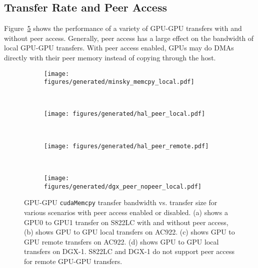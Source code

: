 \subsection{Transfer Rate and Peer Access}
\label{sec:explicit-peer-bandwidth}

Figure~\ref{fig:explicit-peer} shows the performance of a variety of GPU-GPU transfers with and without peer access.
Generally, peer access has a large effect on the bandwidth of local GPU-GPU transfers.
With peer access enabled, GPUs may do DMAs directly with their peer memory instead of copying through the host.

\begin{figure}[H]
	\centering
	\begin{subfigure}[b]{0.3\textwidth}
		\texttt{[image: figures/generated/minsky\_memcpy\_local.pdf]}
		\caption{}
		\label{fig:explicit-s822lc-peer}
	\end{subfigure}
	~
	\begin{subfigure}[b]{0.3\textwidth}
		\texttt{[image: figures/generated/hal\_peer\_local.pdf]}
		\caption{}
		\label{fig:explicit-hal-peer-local}
	\end{subfigure}
	~
	\begin{subfigure}[b]{0.3\textwidth}
		\texttt{[image: figures/generated/hal\_peer\_remote.pdf]}
		\caption{}
		\label{fig:explicit-hal-peer-remote}
	\end{subfigure}
	\\
	\begin{subfigure}[b]{0.3\textwidth}
		\texttt{[image: figures/generated/dgx\_peer\_nopeer\_local.pdf]}
		\caption{}
		\label{fig:explicit-dgx-peer-nopeer-local}
	\end{subfigure}
	
	\caption[GPU-GPU \texttt{cudaMemcpy} bandwidth and peer access]{
		GPU-GPU \texttt{cudaMemcpy} transfer bandwidth vs. transfer size for various scenarios with peer access enabled or disabled.
		(a) shows a GPU0 to GPU1 transfer on S822LC with and without peer access,
		(b) shows GPU to GPU local transfers on AC922.
		(c) shows GPU to GPU remote transfers on AC922.
		(d) shows GPU to GPU local transfers on DGX-1.
		S822LC and DGX-1 do not support peer access for remote GPU-GPU transfers.
	}
	\label{fig:explicit-peer}
\end{figure}

